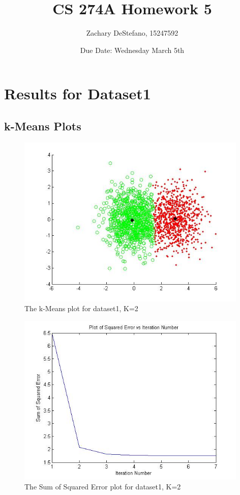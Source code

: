 \documentclass[11pt,psfig]{article}
\begin{document}
\setlength{\parskip}{1.2ex plus0.3ex minus 0.3ex}


\thispagestyle{empty} \pagestyle{myheadings} 



\title{CS 274A Homework 5}
\author{Zachary DeStefano, 15247592}
\date{Due Date: Wednesday March 5th}

\maketitle

 \newpage

\section{Results for Dataset1}

\subsection{k-Means Plots}

\begin{figure}[H]
\centering
\includegraphics[height=3.25in]{dataset1_kMeansPlot.jpg}
\caption{The k-Means plot for dataset1, K=2}
\end{figure}

\begin{figure}[H]
\centering
\includegraphics[height=3.25in]{dataset1_kMeans_squaredErrorPlot.jpg}
\caption{The Sum of Squared Error plot for dataset1, K=2}
\end{figure}
\end{document}
